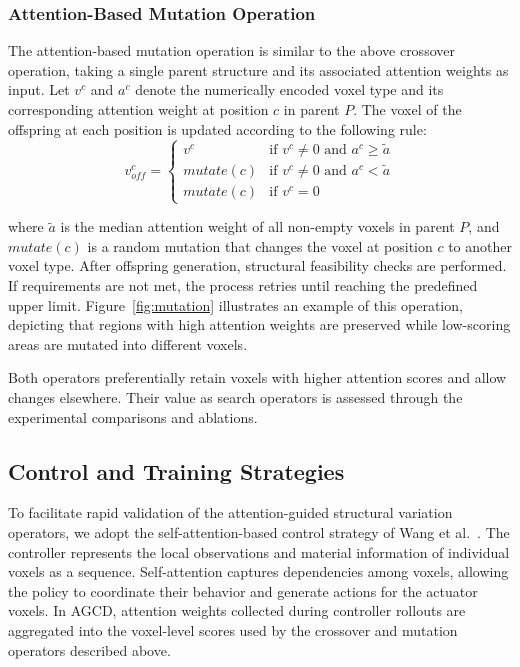 \documentclass{article}
\begin{document}
    \subsubsection{Attention-Based Mutation Operation}
    The attention-based mutation operation is similar to the above crossover operation,
    taking a single parent structure and its associated attention weights as
    input. Let $v^{c}$ and $a^{c}$ denote the numerically encoded voxel type and
    its corresponding attention weight at position $c$ in parent $P$. The voxel
    of the offspring at each position is updated according to the following rule:
    \begin{equation}
        v_{off}^{c}=
        \begin{cases}
            v^{c}     & \text{if }v^{c}\neq0 \text{ and }a^{c}\geq \tilde{a} \\
            mutate(c) & \text{if }v^{c}\neq0 \text{ and }a^{c}< \tilde{a}    \\
            mutate(c) & \text{if }v^{c}=0
        \end{cases}
    \end{equation}

    where $\tilde{a}$ is the median attention weight of all non-empty voxels in
    parent $P$, and $mutate(c)$ is a random mutation that changes the voxel at position
    $c$ to another voxel type. After offspring generation, structural feasibility
    checks are performed. If requirements are not met, the process retries until
    reaching the predefined upper limit. Figure~\ref{fig:mutation} illustrates
    an example of this operation, depicting that regions with high attention weights
    are preserved while low-scoring areas are mutated into different voxels.

    Both operators preferentially retain voxels with higher attention scores
    and allow changes elsewhere. Their value as search operators is assessed
    through the experimental comparisons and ablations.
    \subsection{Control and Training Strategies}
    \label{subsec:control_strategy}

    To facilitate rapid validation of the attention-guided structural variation
    operators, we adopt the self-attention-based control strategy of
    Wang et al.~\cite{wang2023curriculum}. The controller represents the local
    observations and material information of individual voxels as a sequence.
    Self-attention captures dependencies among voxels, allowing the policy to
    coordinate their behavior and generate actions for the actuator voxels.
    In AGCD, attention weights collected during controller rollouts are
    aggregated into the voxel-level scores used by the crossover and mutation
    operators described above.
\end{document}
